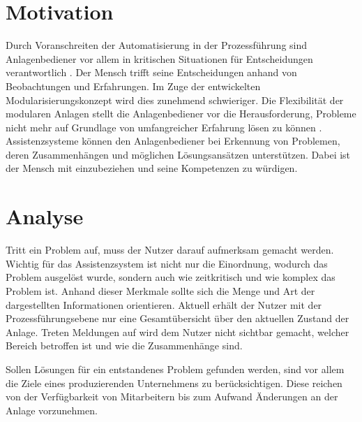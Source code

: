 \documentclass{ifaPoster}
\begin{document}
\section{Motivation}
Durch Voranschreiten der Automatisierung in der Prozessführung sind Anlagenbediener vor allem in kritischen Situationen für Entscheidungen verantwortlich \cite{bainbridget_ironies_1983}. Der Mensch trifft seine Entscheidungen anhand von Beobachtungen und Erfahrungen. Im Zuge der entwickelten Modularisierungskonzept wird dies zunehmend schwieriger. Die Flexibilität der modularen Anlagen stellt die Anlagenbediener vor die Herausforderung, Probleme nicht mehr auf Grundlage von umfangreicher Erfahrung lösen zu können \cite{mueller_2018}. Assistenzsysteme können den Anlagenbediener bei Erkennung von Problemen, deren Zusammenhängen und möglichen Lösungsansätzen unterstützen. Dabei ist der Mensch mit einzubeziehen und seine Kompetenzen zu würdigen.

\section{Analyse}
Tritt ein Problem auf, muss der Nutzer darauf aufmerksam gemacht werden. Wichtig für das Assistenzsystem ist nicht nur die Einordnung, wodurch das Problem ausgelöst wurde, sondern auch wie zeitkritisch und wie komplex das Problem ist. Anhand dieser Merkmale sollte sich die Menge und Art der dargestellten Informationen orientieren. Aktuell erhält der Nutzer mit der Prozessführungsebene nur eine Gesamtübersicht über den aktuellen Zustand der Anlage. Treten Meldungen auf wird dem Nutzer nicht sichtbar gemacht, welcher Bereich betroffen ist und wie die Zusammenhänge sind.

Sollen Lösungen für ein entstandenes Problem gefunden werden, sind vor allem die Ziele eines produzierenden Unternehmens zu berücksichtigen. Diese reichen von der Verfügbarkeit von Mitarbeitern bis zum Aufwand Änderungen an der Anlage vorzunehmen.
\end{document}
